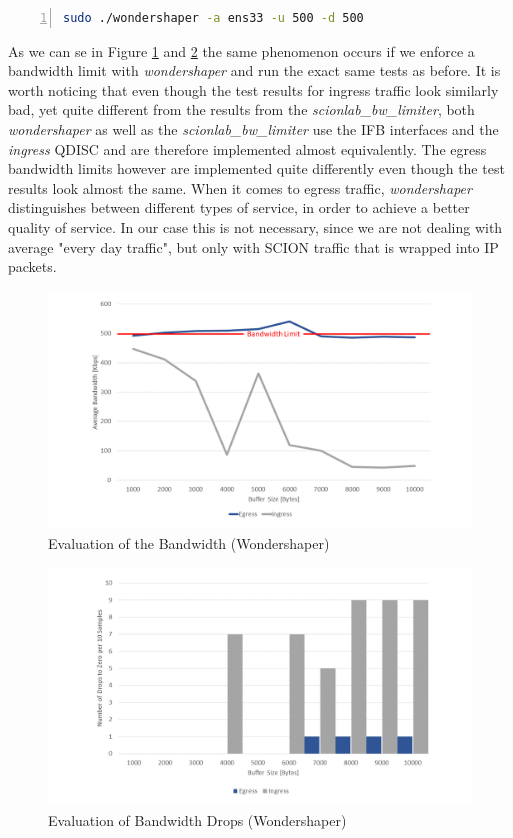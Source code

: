 \begin{lstlisting}[language=sh, caption = Wondershaper command, captionpos=b, numbers=left, frame=single, breaklines=true, breakatwhitespace=true, showstringspaces=false, label=Wondershaper command]
sudo ./wondershaper -a ens33 -u 500 -d 500
\end{lstlisting}

As we can se in Figure \ref{Evaluation of the Bandwidth (Wondershaper)} and \ref{Evaluation of the Bandwidth Drops (Wondershaper)} the same phenomenon occurs if we enforce a bandwidth limit with \textit{wondershaper} and run the exact same tests as before. It is worth noticing that even though the test results for ingress traffic look similarly bad, yet quite different from the results from the \textit{scionlab\_bw\_limiter}, both \textit{wondershaper} as well as the \textit{scionlab\_bw\_limiter} use the \acs{IFB} interfaces and the \textit{ingress} \acs{QDISC} and are therefore implemented almost equivalently. The egress bandwidth limits however are implemented quite differently even though the test results look almost the same. When it comes to egress traffic, \textit{wondershaper} distinguishes between different types of service, in order to achieve a better quality of service. In our case this is not necessary, since we are not dealing with average "every day traffic", but only with \acs{SCION} traffic that is wrapped into \acs{IP} packets.  

\begin{figure}[h]
	\centering
	\includegraphics[width=\textwidth]{img/Evaluation-Bandwidth-Wondershaper.png}
	\caption{Evaluation of the Bandwidth (Wondershaper)}
	\label{Evaluation of the Bandwidth (Wondershaper)}
\end{figure}

\begin{figure}[h]
	\centering
	\includegraphics[width=\textwidth]{img/Evaluation-Zeros-Wondershaper.png}
	\caption{Evaluation of Bandwidth Drops (Wondershaper)}
	\label{Evaluation of the Bandwidth Drops (Wondershaper)}
\end{figure}
